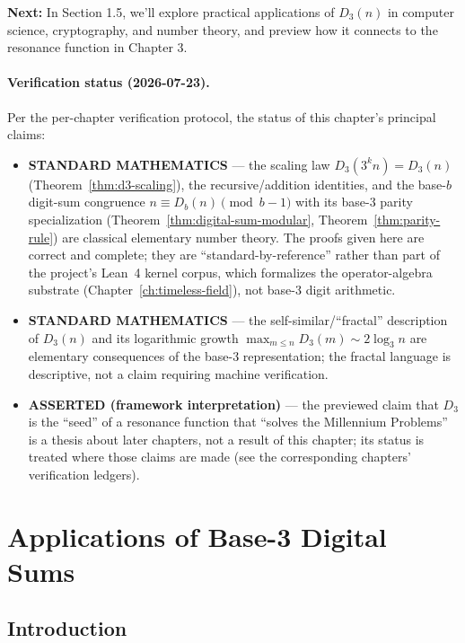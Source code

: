 \textbf{Next:} In Section 1.5, we'll explore practical applications of $D_3(n)$ in computer science, cryptography, and number theory, and preview how it connects to the resonance function in Chapter 3.

\paragraph{Verification status (2026-07-23).}
Per the per-chapter verification protocol, the status of this chapter's principal claims:
\begin{itemize}
\item \textbf{STANDARD MATHEMATICS} --- the scaling law $D_3(3^k n) = D_3(n)$ (Theorem~\ref{thm:d3-scaling}), the recursive/addition identities, and the base-$b$ digit-sum congruence $n \equiv D_b(n) \pmod{b-1}$ with its base-3 parity specialization (Theorem~\ref{thm:digital-sum-modular}, Theorem~\ref{thm:parity-rule}) are classical elementary number theory. The proofs given here are correct and complete; they are ``standard-by-reference'' rather than part of the project's Lean~4 kernel corpus, which formalizes the operator-algebra substrate (Chapter~\ref{ch:timeless-field}), not base-3 digit arithmetic.
\item \textbf{STANDARD MATHEMATICS} --- the self-similar/``fractal'' description of $D_3(n)$ and its logarithmic growth $\max_{m\le n} D_3(m)\sim 2\log_3 n$ are elementary consequences of the base-3 representation; the fractal language is descriptive, not a claim requiring machine verification.
\item \textbf{ASSERTED (framework interpretation)} --- the previewed claim that $D_3$ is the ``seed'' of a resonance function that ``solves the Millennium Problems'' is a thesis about later chapters, not a result of this chapter; its status is treated where those claims are made (see the corresponding chapters' verification ledgers).
\end{itemize}



\section{Applications of Base-3 Digital Sums}
\label{sec:applications}

\subsection{Introduction}

